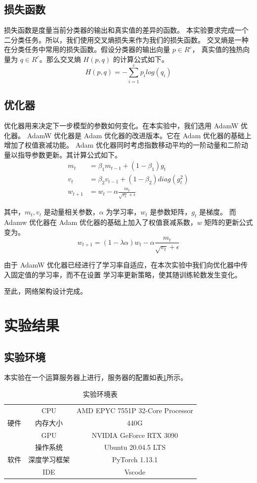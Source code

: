 \documentclass[supercite]{Experimental_Report}
\theoremstyle{definition}
\begin{document}
\subsection{损失函数}
损失函数是度量当前分类器的输出和真实值的差异的函数。
本实验要求完成一个二分类任务。所以，我们使用交叉熵损失来作为我们的损失函数。
交叉熵是一种在分类任务中常用的损失函数。假设分类器的输出向量 $p\in R^c$，
真实值的独热向量为 $q\in R^c$。那么交叉熵 $H(p, q)$ 的计算公式如下。
$$
H(p, q)=-\sum_{i=1}^{c}p_i log(q_i)
$$

\subsection{优化器}
优化器用来决定下一步模型的参数如何变化。在本实验中，我们选用 AdamW 优化器。
AdamW 优化器是 Adam 优化器的改进版本。它在 Adam 优化器的基础上增加了权值衰减功能。
Adam 优化器同时考虑指数移动平均的一阶动量和二阶动量以指导参数更新。其计算公式如下。
$$
\begin{aligned}
	m_t&=\beta_1m_{t-1}+(1-\beta_1)g_t\\
	v_t&=\beta_2v_{t-1}+(1-\beta_2)diag(g_t^2)\\
	w_{t+1}&=w_{t}-\alpha\frac{m_t}{\sqrt{v_t}+\epsilon}
\end{aligned}
$$

其中，$m_t, v_t$ 是动量相关参数，$\alpha$ 为学习率，$w_t$ 是参数矩阵，$g_t$ 是梯度。
而 Adamw 优化器在 Adam 优化器的基础上加入了权值衰减系数，$w$ 矩阵的更新公式变为。
$$
w_{t+1}=(1-\lambda \alpha)w_{t}-\alpha\frac{m_t}{\sqrt{v_t}+\epsilon}
$$

由于 AdamW 优化器已经进行了学习率自适应，在本次实验中我们向优化器中传入固定值的学习率，而不在设置
学习率更新策略，使其随训练轮数发生变化。

至此，网络架构设计完成。


\section{实验结果}
\subsection{实验环境}
本实验在一个运算服务器上进行，服务器的配置如表\ref{服务器配置}所示。
\begin{table}[H]
	\centering
	\caption{实验环境表}
	  \begin{tabular}{c|c|c}
		\toprule
	  \multirow{3}[0]{*}{硬件} & CPU   & AMD EPYC 7551P 32-Core Processor \\
			& 内存大小    & 440G \\
			& GPU   & NVIDIA GeForce RTX 3090 \\\hline
	  \multirow{3}[0]{*}{软件} & 操作系统  & Ubuntu 20.04.5 LTS \\
			& 深度学习框架 & PyTorch 1.13.1 \\
			& IDE   & Vscode \\\bottomrule
	  \end{tabular}
	\label{服务器配置}
\end{table}
\end{document}
